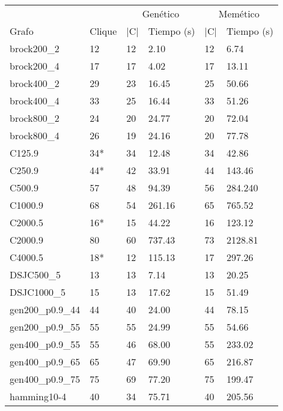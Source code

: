 \begin{small}
\begin{longtable}{l l l l l l}
  \label{table:geneticos}\\
    && \multicolumn{2}{c}{Genético} & \multicolumn{2}{c}{Memético} \\ \cline{3-6}
    Grafo              & Clique & |C| & Tiempo (s) & |C| & Tiempo (s) \\ \hline
    \endhead
    \endfoot
    brock200\_2        & 12 & 12 & 2.10 & 12 & 6.74\\ \hline
    brock200\_4        & 17 & 17 & 4.02 & 17 & 13.11\\ \hline
    brock400\_2        & 29 & 23 & 16.45 & 25 & 50.66\\ \hline
    brock400\_4        & 33 & 25 & 16.44 & 33 & 51.26\\ \hline
    brock800\_2        & 24 & 20 & 24.77 & 20 & 72.04\\ \hline
    brock800\_4        & 26 & 19 & 24.16 & 20 & 77.78\\ \hline
    C125.9             & 34* & 34 & 12.48 & 34 & 42.86\\ \hline
    C250.9             & 44* & 42 & 33.91 & 44 & 143.46\\ \hline
    C500.9             & 57 & 48 & 94.39 & 56 & 284.240\\ \hline
    C1000.9            & 68 & 54 & 261.16 & 65 & 765.52\\ \hline
    C2000.5            & 16* & 15 & 44.22 & 16 & 123.12\\ \hline
    C2000.9            & 80 & 60 & 737.43 & 73 & 2128.81\\ \hline
    C4000.5            & 18* & 12 & 115.13 & 17 & 297.26\\ \hline
    DSJC500\_5         & 13 & 13 & 7.14 & 13 & 20.25\\ \hline
    DSJC1000\_5        & 15 & 13 & 17.62 & 15 & 51.49\\ \hline
    gen200\_p0.9\_44   & 44 & 40 & 24.00 & 44 & 78.15\\ \hline
    gen200\_p0.9\_55   & 55 & 55 & 24.99 & 55 & 54.66\\ \hline
    gen400\_p0.9\_55   & 55 & 46 & 68.00 & 55 & 233.02 \\ \hline
    gen400\_p0.9\_65   & 65 & 47 & 69.90 & 65 & 216.87\\ \hline
    gen400\_p0.9\_75   & 75 & 69 & 77.20 & 75 & 199.47\\ \hline
    hamming10-4        & 40 & 34 & 75.71 & 40 & 205.56\\ \hline

\end{longtable}
\end{small}
